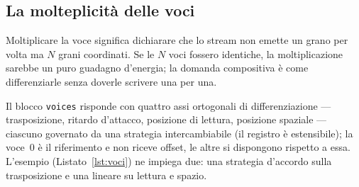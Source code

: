 %
%

\subsection{La molteplicità delle voci}\label{sec:voci}

Moltiplicare la voce significa dichiarare che lo stream non emette un
grano per volta ma $N$ grani coordinati. Se le $N$ voci fossero
identiche, la moltiplicazione sarebbe un puro guadagno d'energia; la
domanda compositiva è come differenziarle senza doverle scrivere una per
una.

Il blocco \texttt{voices} risponde con quattro assi ortogonali di
differenziazione --- trasposizione, ritardo d'attacco, posizione di
lettura, posizione spaziale --- ciascuno governato da una strategia
intercambiabile (il registro è estensibile); la voce~0 è il riferimento
e non riceve offset, le altre si dispongono rispetto a essa.
L'esempio (Listato~\ref{lst:voci}) ne impiega due: una strategia
d'accordo sulla trasposizione e una lineare su lettura e spazio.

    

